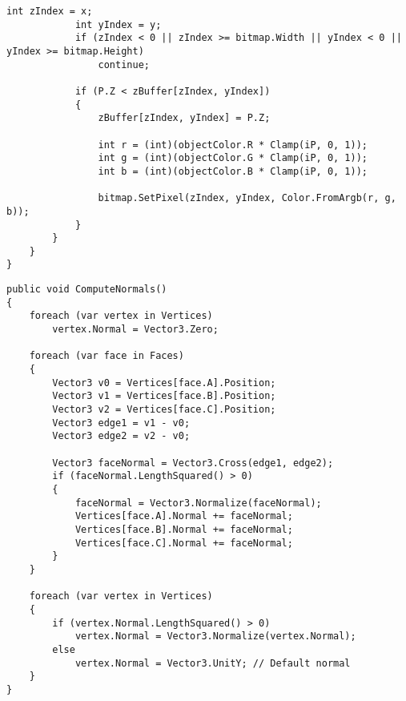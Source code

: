 \begin{center}
\begin{lstlisting}[label=lst:zbuf,caption=Алгоритм отрисовки полигона с помощью Z-буффера,numbers=none]
            int zIndex = x;
            int yIndex = y;
            if (zIndex < 0 || zIndex >= bitmap.Width || yIndex < 0 || yIndex >= bitmap.Height)
                continue;

            if (P.Z < zBuffer[zIndex, yIndex])
            {
                zBuffer[zIndex, yIndex] = P.Z;

                int r = (int)(objectColor.R * Clamp(iP, 0, 1));
                int g = (int)(objectColor.G * Clamp(iP, 0, 1));
                int b = (int)(objectColor.B * Clamp(iP, 0, 1));

                bitmap.SetPixel(zIndex, yIndex, Color.FromArgb(r, g, b));
            }
        }
    }
}
\end{lstlisting}
\end{center}
\clearpage

\begin{center}
\captionsetup{justification=raggedright,singlelinecheck=off}
\begin{lstlisting}[label=lst:тnormals,caption=Алгоритм обновления нормалей объекта,numbers=none]
public void ComputeNormals()
{
    foreach (var vertex in Vertices)
        vertex.Normal = Vector3.Zero;

    foreach (var face in Faces)
    {
        Vector3 v0 = Vertices[face.A].Position;
        Vector3 v1 = Vertices[face.B].Position;
        Vector3 v2 = Vertices[face.C].Position;
        Vector3 edge1 = v1 - v0;
        Vector3 edge2 = v2 - v0;

        Vector3 faceNormal = Vector3.Cross(edge1, edge2);
        if (faceNormal.LengthSquared() > 0)
        {
            faceNormal = Vector3.Normalize(faceNormal);
            Vertices[face.A].Normal += faceNormal;
            Vertices[face.B].Normal += faceNormal;
            Vertices[face.C].Normal += faceNormal;
        }
    }

    foreach (var vertex in Vertices)
    {
        if (vertex.Normal.LengthSquared() > 0)
            vertex.Normal = Vector3.Normalize(vertex.Normal);
        else
            vertex.Normal = Vector3.UnitY; // Default normal
    }
}
\end{lstlisting}
\end{center}

